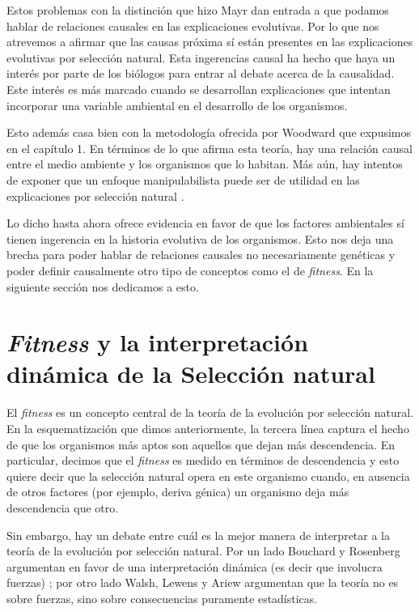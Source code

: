 Estos problemas con la distinción que hizo Mayr dan entrada a que podamos hablar de relaciones causales en las explicaciones evolutivas. Por lo que nos atrevemos a afirmar que las causas próxima sí están presentes en las explicaciones evolutivas por selección natural. Esta ingerencias causal ha hecho que haya un interés por parte de los biólogos para entrar al debate acerca de la causalidad. Este interés es más marcado cuando se desarrollan explicaciones que intentan incorporar una variable ambiental en el desarrollo de los organismos.

Esto además casa bien con la metodología ofrecida por Woodward que expusimos en el capítulo 1. En términos de lo que afirma esta teoría, hay una relación causal entre el medio ambiente y los organismos que lo habitan. Más aún, hay intentos de exponer que un enfoque manipulabilista puede ser de utilidad en las explicaciones por selección natural \cite{MacColl2011}.

Lo dicho hasta ahora ofrece evidencia en favor de que los factores ambientales sí tienen ingerencia en la historia evolutiva de los organismos. Esto nos deja una brecha para poder hablar de relaciones causales no necesariamente genéticas y poder definir causalmente otro tipo de conceptos como el de \emph{fitness}. En la siguiente sección nos dedicamos a esto.

\section{\emph{Fitness} y la interpretación dinámica de la Selección natural}

\noindent El \emph{fitness} es un concepto central de la teoría de la evolución por selección natural. En la esquematización que dimos anteriormente, la tercera línea captura el hecho de que los organismos más aptos son aquellos que dejan más descendencia. En particular, decimos que el \emph{fitness} es medido en términos de descendencia y esto quiere decir que la selección natural opera en este organismo cuando, en ausencia de otros factores (por ejemplo, deriva génica) un organismo deja más descendencia que otro.

Sin embargo, hay un debate entre cuál es la mejor manera de interpretar a la teoría de la evolución por selección natural. Por un lado Bouchard y Rosenberg argumentan en favor de una interpretación dinámica (es decir que involucra fuerzas) \citeyear{Bouchard2004}; por otro lado Walsh, Lewens y Ariew \citeyear{Walsh2002} argumentan que la teoría no es sobre fuerzas, sino sobre consecuencias puramente estadísticas.


